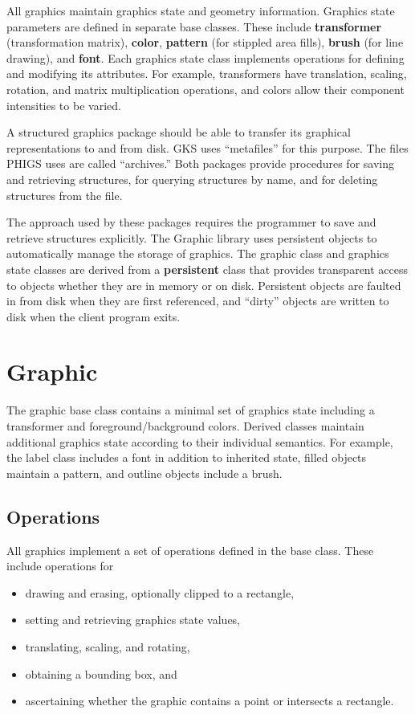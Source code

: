 All graphics maintain graphics state and geometry
information.  Graphics state parameters are defined in separate base classes.
These include {\bf transformer} (transformation matrix), {\bf color},
{\bf pattern} (for stippled area fills), {\bf brush} (for line drawing),
and {\bf font}.
Each graphics state class implements operations for defining and modifying its
attributes.  For example, transformers have translation, scaling, rotation, 
and matrix multiplication operations, and 
colors allow their component intensities to be varied.

A structured graphics package should be able to transfer its graphical
representations to and from disk.  GKS uses ``metafiles'' for this purpose.
The files PHIGS uses are called ``archives.''  Both packages provide
procedures for saving and retrieving structures, for 
querying structures by name, and for deleting structures from the file.

The approach used by these packages requires the programmer to save and
retrieve structures explicitly.  The Graphic library uses
persistent objects to automatically manage the storage of
graphics.  The graphic class and graphics state classes are
derived from a {\bf persistent} class that
provides transparent access to objects whether they are in memory or on
disk.  Persistent objects are faulted in from disk when they are first
referenced,
and ``dirty'' objects are written to disk when the client program exits.

\section{Graphic}

The graphic base class contains a minimal set of graphics state including a
transformer and foreground/background colors.  Derived classes maintain
additional graphics state according to their individual semantics.  For
example, the label class includes a font in addition to inherited state,
filled objects maintain a pattern, and outline objects include a brush.

\subsection{Operations}

All graphics implement a set of operations defined in the base class.
These include operations for
\begin{itemize}

\item drawing and erasing, optionally clipped to a rectangle,
\item setting and retrieving graphics state values, 
\item translating, scaling, and rotating, 
\item obtaining a bounding box, and
\item ascertaining whether the graphic contains a point or
    intersects a rectangle.

\end{itemize}

